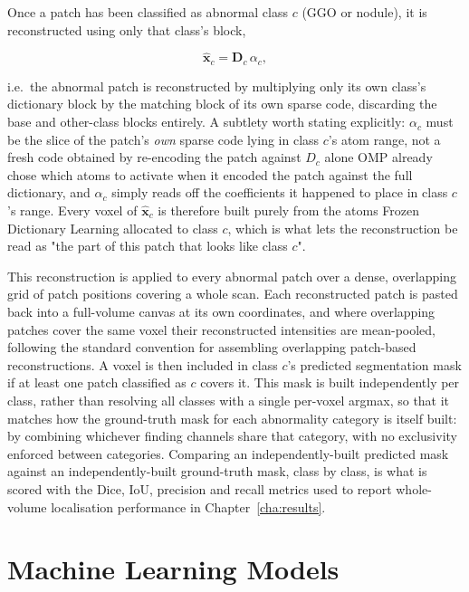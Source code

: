 Once a patch has been classified as abnormal class $c$ (GGO or nodule), it is reconstructed using only that class's block,

\begin{equation}[Class-Specific Patch Reconstruction]
\hat{\mathbf{x}}_{c} = \mathbf{D}_{c}\,\alpha_{c},
\end{equation}

\noindent i.e.\ the abnormal patch is reconstructed by multiplying only its own class's dictionary block by the matching block
of its own sparse code, discarding the base and other-class blocks entirely. A subtlety worth stating explicitly: $\alpha_c$
must be the slice of the patch's \emph{own} sparse code lying in class $c$'s atom range, not a fresh code obtained by
re-encoding the patch against $D_c$ alone OMP already chose which atoms to activate when it encoded the patch against the
full dictionary, and $\alpha_c$ simply reads off the coefficients it happened to place in class $c$'s range. Every voxel of
$\hat{\mathbf{x}}_c$ is therefore built purely from the atoms Frozen Dictionary Learning allocated to class $c$, which is what
lets the reconstruction be read as "the part of this patch that looks like class $c$".

This reconstruction is applied to every abnormal patch over a dense, overlapping grid of patch positions covering a whole scan.
Each reconstructed patch is pasted back into a full-volume canvas at its own coordinates, and where overlapping patches cover the
same voxel their reconstructed intensities are mean-pooled, following the standard convention for assembling overlapping
patch-based reconstructions. A voxel is then included in class $c$'s predicted segmentation mask if at least one patch
classified as $c$ covers it. This mask is built independently per class, rather than resolving all classes with a single
per-voxel argmax, so that it matches how the ground-truth mask for each abnormality category is itself built: by combining
whichever finding channels share that category, with no exclusivity enforced between categories. Comparing an independently-built
predicted mask against an independently-built ground-truth mask, class by class, is what is scored with the Dice, IoU,
precision and recall metrics used to report whole-volume localisation performance in Chapter~\ref{cha:results}.

\section{Machine Learning Models}
\label{sec:ml-baseline-methods}

